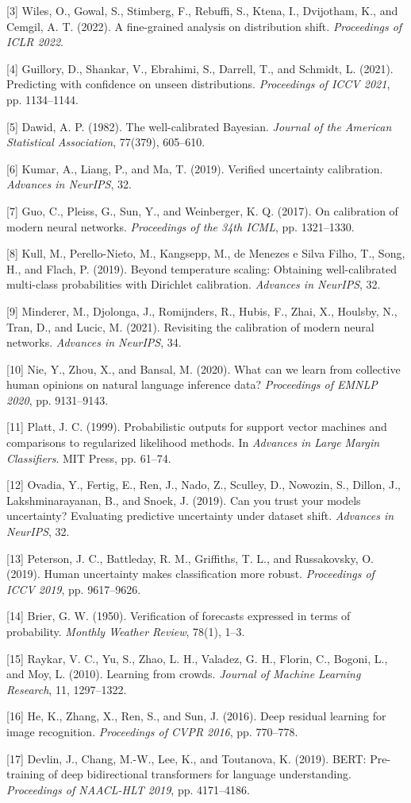 \documentclass[11pt]{article}
\begin{document}
{[}3{]} Wiles, O., Gowal, S., Stimberg, F., Rebuffi, S., Ktena, I.,
Dvijotham, K., and Cemgil, A. T. (2022). A fine-grained analysis on
distribution shift. \emph{Proceedings of ICLR 2022}.

{[}4{]} Guillory, D., Shankar, V., Ebrahimi, S., Darrell, T., and
Schmidt, L. (2021). Predicting with confidence on unseen distributions.
\emph{Proceedings of ICCV 2021}, pp. 1134--1144.

{[}5{]} Dawid, A. P. (1982). The well-calibrated Bayesian. \emph{Journal
of the American Statistical Association}, 77(379), 605--610.

{[}6{]} Kumar, A., Liang, P., and Ma, T. (2019). Verified uncertainty
calibration. \emph{Advances in NeurIPS}, 32.

{[}7{]} Guo, C., Pleiss, G., Sun, Y., and Weinberger, K. Q. (2017). On
calibration of modern neural networks. \emph{Proceedings of the 34th
ICML}, pp. 1321--1330.

{[}8{]} Kull, M., Perello-Nieto, M., Kangsepp, M., de Menezes e Silva
Filho, T., Song, H., and Flach, P. (2019). Beyond temperature scaling:
Obtaining well-calibrated multi-class probabilities with Dirichlet
calibration. \emph{Advances in NeurIPS}, 32.

{[}9{]} Minderer, M., Djolonga, J., Romijnders, R., Hubis, F., Zhai, X.,
Houlsby, N., Tran, D., and Lucic, M. (2021). Revisiting the calibration
of modern neural networks. \emph{Advances in NeurIPS}, 34.

{[}10{]} Nie, Y., Zhou, X., and Bansal, M. (2020). What can we learn
from collective human opinions on natural language inference data?
\emph{Proceedings of EMNLP 2020}, pp. 9131--9143.

{[}11{]} Platt, J. C. (1999). Probabilistic outputs for support vector
machines and comparisons to regularized likelihood methods. In
\emph{Advances in Large Margin Classifiers}. MIT Press, pp. 61--74.

{[}12{]} Ovadia, Y., Fertig, E., Ren, J., Nado, Z., Sculley, D.,
Nowozin, S., Dillon, J., Lakshminarayanan, B., and Snoek, J. (2019). Can
you trust your model\textquotesingle s uncertainty? Evaluating
predictive uncertainty under dataset shift. \emph{Advances in NeurIPS},
32.

{[}13{]} Peterson, J. C., Battleday, R. M., Griffiths, T. L., and
Russakovsky, O. (2019). Human uncertainty makes classification more
robust. \emph{Proceedings of ICCV 2019}, pp. 9617--9626.

{[}14{]} Brier, G. W. (1950). Verification of forecasts expressed in
terms of probability. \emph{Monthly Weather Review}, 78(1), 1--3.

{[}15{]} Raykar, V. C., Yu, S., Zhao, L. H., Valadez, G. H., Florin, C.,
Bogoni, L., and Moy, L. (2010). Learning from crowds. \emph{Journal of
Machine Learning Research}, 11, 1297--1322.

{[}16{]} He, K., Zhang, X., Ren, S., and Sun, J. (2016). Deep residual
learning for image recognition. \emph{Proceedings of CVPR 2016}, pp.
770--778.

{[}17{]} Devlin, J., Chang, M.-W., Lee, K., and Toutanova, K. (2019).
BERT: Pre-training of deep bidirectional transformers for language
understanding. \emph{Proceedings of NAACL-HLT 2019}, pp. 4171--4186.
\end{document}
